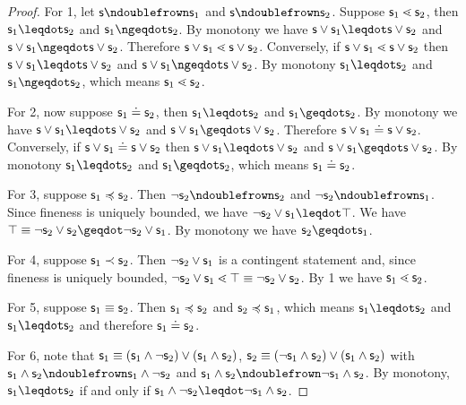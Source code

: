 \documentclass{article}
\begin{document}
\begin{proof}
For 1, let $\stmt \ncomp \stmt_1$ and $\stmt \ncomp \stmt_2$. Suppose $\mathsf{s}_1 \lessdot \mathsf{s}_2$, then $\stmt_1 \finer \stmt_2$ and $\stmt_1 \ncoarser \stmt_2$. By monotony we have $\stmt \OR \stmt_1 \finer \stmt \OR \stmt_2$ and $\stmt \OR \stmt_1 \ncoarser \stmt \OR \stmt_2$. Therefore $\mathsf{s} \vee \mathsf{s}_1 \lessdot \mathsf{s} \vee \mathsf{s}_2$. Conversely, if $\mathsf{s} \vee \mathsf{s}_1 \lessdot \mathsf{s} \vee \mathsf{s}_2$ then $\stmt \OR \stmt_1 \finer \stmt \OR \stmt_2$ and $\stmt \OR \stmt_1 \ncoarser \stmt \OR \stmt_2$. By monotony $\stmt_1 \finer \stmt_2$ and $\stmt_1 \ncoarser \stmt_2$, which means $\mathsf{s}_1 \lessdot \mathsf{s}_2$.

For 2, now suppose $\mathsf{s}_1 \doteq \mathsf{s}_2$, then $\stmt_1 \finer \stmt_2$ and $\stmt_1 \coarser \stmt_2$. By monotony we have $\stmt \OR \stmt_1 \finer \stmt \OR \stmt_2$ and $\stmt \OR \stmt_1 \coarser \stmt \OR \stmt_2$. Therefore $\mathsf{s} \vee \mathsf{s}_1 \doteq \mathsf{s} \vee \mathsf{s}_2$. Conversely, if $\mathsf{s} \vee \mathsf{s}_1 \doteq \mathsf{s} \vee \mathsf{s}_2$ then $\stmt \OR \stmt_1 \finer \stmt \OR \stmt_2$ and $\stmt \OR \stmt_1 \coarser \stmt \OR \stmt_2$. By monotony $\stmt_1 \finer \stmt_2$ and $\stmt_1 \coarser \stmt_2$, which means $\mathsf{s}_1 \doteq \mathsf{s}_2$.

For 3, suppose $\mathsf{s}_1 \preccurlyeq \mathsf{s}_2$. Then $\NOT \stmt_2 \ncomp \stmt_2$ and $\NOT \stmt_2 \ncomp \stmt_1$. Since fineness is uniquely bounded, we have $\NOT \stmt_2 \OR \stmt_1 \finer \certainty$. We have $\certainty \equiv \NOT \stmt_2 \OR \stmt_2 \coarser \NOT \stmt_2 \OR \stmt_1$. By monotony we have $\stmt_2 \coarser \stmt_1$.

For 4, suppose $\mathsf{s}_1 \prec \mathsf{s}_2$. Then $\neg \mathsf{s}_2 \vee \mathsf{s}_1$ is a contingent statement and, since fineness is uniquely bounded, $\neg \mathsf{s}_2 \vee \mathsf{s}_1 \lessdot \top \equiv \neg \mathsf{s}_2 \vee \mathsf{s}_2$. By 1 we have $\mathsf{s}_1 \lessdot \mathsf{s}_2$.

For 5, suppose $\mathsf{s}_1 \equiv \mathsf{s}_2$. Then $\mathsf{s}_1 \preccurlyeq \mathsf{s}_2$ and $\mathsf{s}_2 \preccurlyeq \mathsf{s}_1$, which means $\stmt_1 \finer \stmt_2$ and $\stmt_1 \finer \stmt_2$ and therefore $\mathsf{s}_1 \doteq \mathsf{s}_2$.

For 6, note that $\mathsf{s}_1 \equiv (\mathsf{s}_1 \wedge \neg \mathsf{s}_2) \vee (\mathsf{s}_1 \wedge \mathsf{s}_2)$, $\mathsf{s}_2 \equiv (\neg \mathsf{s}_1 \wedge \mathsf{s}_2) \vee (\mathsf{s}_1 \wedge \mathsf{s}_2)$ with $\stmt_1 \AND \stmt_2 \ncomp \stmt_1 \AND \NOT \stmt_2$ and $\stmt_1 \AND \stmt_2 \ncomp \NOT \stmt_1 \AND \stmt_2$. By monotony, $\stmt_1 \finer \stmt_2$ if and only if $\stmt_1 \AND \NOT \stmt_2 \finer \NOT \stmt_1 \AND \stmt_2$.


\end{proof}
\end{document}
